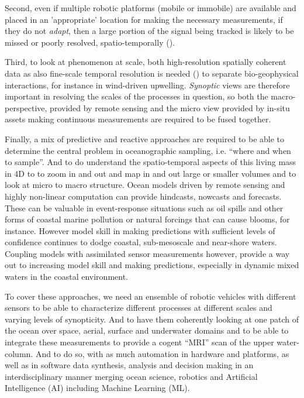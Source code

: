 Second, even if multiple robotic platforms (mobile or immobile) are
available and placed in an 'appropriate' location for making the
necessary measurements, if they do not \emph{adapt}, then a large
portion of the signal being tracked is likely to be missed or poorly
resolved, spatio-temporally ().

Third, to look at phenomenon at scale, both high-resolution spatially
coherent data as also fine-scale temporal resolution is needed
() to separate bio-geophysical interactions, for instance in
wind-driven upwelling. \emph{Synoptic} views are therefore important
in resolving the scales of the processes in question, so both the
macro- perspective, provided by remote sensing and the micro view
provided by in-situ assets making continuous measurements are required
to be fused together.

Finally, a mix of predictive and reactive approaches are required to
be able to determine the central problem in oceanographic sampling,
i.e. ``where and when to sample''. And to do understand the
spatio-temporal aspects of this living mass in 4D to to zoom in and
out and map in and out large or smaller volumes and to look at micro
to macro structure. Ocean models driven by remote sensing and highly
non-linear computation can provide hindcasts, nowcasts and
forecasts. These can be valuable in event-response situations such as
oil spills and other forms of coastal marine pollution or natural
forcings that can cause blooms, for instance. However model skill in
making predictions with sufficient levels of confidence continues to
dodge coastal, sub-mesoscale and near-shore waters. Coupling models
with assimilated sensor measurements however, provide a way out to
increasing model skill and making predictions, especially in dynamic
mixed waters in the coastal environment.

To cover these approaches, we need an ensemble of robotic vehicles
with different sensors to be able to characterize different processes
at different scales and varying levels of synopticity. And to have
them coherently looking at one patch of the ocean over space, aerial,
surface and underwater domains and to be able to integrate
these measurements to provide a cogent ``MRI'' scan of the upper
water-column. And to do so, with as much automation in hardware and
platforms, as well as in software data synthesis, analysis and
decision making in an interdisciplinary manner merging ocean science,
robotics and Artificial Intelligence (AI) including Machine Learning
(ML). 


